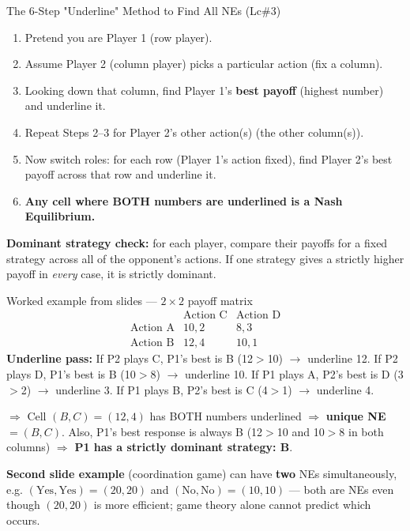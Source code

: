 \documentclass[12pt,a4paper]{article}
\begin{document}
\begin{algobox}{The 6-Step "Underline" Method to Find All NEs (Lc\#3)}
\begin{enumerate}[noitemsep]
  \item Pretend you are Player 1 (row player).
  \item Assume Player 2 (column player) picks a particular action (fix a column).
  \item Looking down that column, find Player 1's \textbf{best payoff} (highest number) and underline it.
  \item Repeat Steps 2--3 for Player 2's other action(s) (the other column(s)).
  \item Now switch roles: for each row (Player 1's action fixed), find Player 2's best payoff across that row and underline it.
  \item \textbf{Any cell where BOTH numbers are underlined is a Nash Equilibrium.}
\end{enumerate}
\textbf{Dominant strategy check:} for each player, compare their payoffs for a fixed strategy across all of the opponent's actions. If one strategy gives a strictly higher payoff in \emph{every} case, it is strictly dominant.
\end{algobox}

\begin{keybox}{Worked example from slides --- $2\times2$ payoff matrix}
\[
\begin{array}{c|cc}
 & \text{Action C} & \text{Action D} \\\hline
\text{Action A} & 10,2 & 8,3 \\
\text{Action B} & 12,4 & 10,1
\end{array}
\]
\textbf{Underline pass:} If P2 plays C, P1's best is B (12$>$10) $\to$ underline 12. If P2 plays D, P1's best is B (10$>$8) $\to$ underline 10. If P1 plays A, P2's best is D (3$>$2) $\to$ underline 3. If P1 plays B, P2's best is C (4$>$1) $\to$ underline 4.

$\Rightarrow$ Cell $(B,C)=(12,4)$ has BOTH numbers underlined $\Rightarrow$ \textbf{unique NE $=(B,C)$}. Also, P1's best response is always B (12$>$10 and 10$>$8 in both columns) $\Rightarrow$ \textbf{P1 has a strictly dominant strategy: B}.

\textbf{Second slide example} (coordination game) can have \textbf{two} NEs simultaneously, e.g. $(\text{Yes},\text{Yes})=(20,20)$ and $(\text{No},\text{No})=(10,10)$ --- both are NEs even though $(20,20)$ is more efficient; game theory alone cannot predict which occurs.
\end{keybox}
\end{document}
